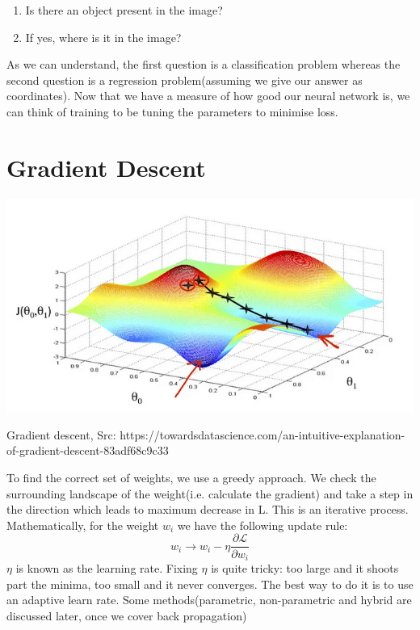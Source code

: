 \begin{enumerate}
    \item Is there an object present in the image?
    \item If yes, where is it in the image?
\end{enumerate}

As we can understand, the first question is a classification problem whereas the second question is a regression problem(assuming we give our answer as coordinates). Now that we have a measure of how good our neural network is, we can think of training to be tuning the parameters to minimise loss.
\section{Gradient Descent}
\begin{marginfigure}
    \begin{center}
        \includegraphics[width=\textwidth]{graphics/grad-desc.png}
    \end{center}
    \caption{Gradient descent, Src: https://towardsdatascience.com/an-intuitive-explanation-
    of-gradient-descent-83adf68c9c33}
\end{marginfigure}
To find the correct set of weights, we use a greedy approach. We check the surrounding landscape
of the weight(i.e. calculate the gradient) and take a step in the direction which leads to maximum
decrease in L. This is an iterative process. Mathematically, for the weight $w_i$ we have the following
update rule:
$$w_i\to w_i-\eta\frac{\partial \mathcal L}{\partial w_i}$$
$\eta$ is known as the learning rate. Fixing $\eta$ is quite tricky: too large and it shoots part the minima, too small and it never converges. The best way to do it is to  use an adaptive learn rate. Some methods(parametric, non-parametric and
hybrid are discussed later, once we cover back propagation)

